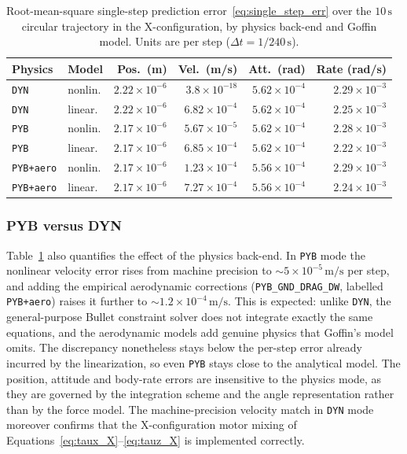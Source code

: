 \documentclass[11pt,a4paper]{article}
\theoremstyle{remark}
\numberwithin{equation}{section}
\begin{document}
\begin{table}[h]
    \centering
    \caption{Root-mean-square single-step prediction
    error~\eqref{eq:single_step_err} over the $10\,\mathrm{s}$ circular
    trajectory in the X-configuration, by physics back-end and Goffin model.
    Units are per step ($\Delta t = 1/240\,\mathrm{s}$).}
    \label{tab:singlestep_rms}
    \small
    \begin{tabular}{ll rrrr}
        \toprule
        Physics & Model & Pos.\ (m) & Vel.\ (m/s) & Att.\ (rad) & Rate (rad/s) \\
        \midrule
        \texttt{DYN} & nonlin. & $2.22\!\times\!10^{-6}$ & $3.8\!\times\!10^{-18}$ & $5.62\!\times\!10^{-4}$ & $2.29\!\times\!10^{-3}$ \\
        \texttt{DYN} & linear. & $2.22\!\times\!10^{-6}$ & $6.82\!\times\!10^{-4}$ & $5.62\!\times\!10^{-4}$ & $2.25\!\times\!10^{-3}$ \\
        \texttt{PYB} & nonlin. & $2.17\!\times\!10^{-6}$ & $5.67\!\times\!10^{-5}$ & $5.62\!\times\!10^{-4}$ & $2.28\!\times\!10^{-3}$ \\
        \texttt{PYB} & linear. & $2.17\!\times\!10^{-6}$ & $6.85\!\times\!10^{-4}$ & $5.62\!\times\!10^{-4}$ & $2.22\!\times\!10^{-3}$ \\
        \texttt{PYB+aero} & nonlin. & $2.17\!\times\!10^{-6}$ & $1.23\!\times\!10^{-4}$ & $5.56\!\times\!10^{-4}$ & $2.29\!\times\!10^{-3}$ \\
        \texttt{PYB+aero} & linear. & $2.17\!\times\!10^{-6}$ & $7.27\!\times\!10^{-4}$ & $5.56\!\times\!10^{-4}$ & $2.24\!\times\!10^{-3}$ \\
        \bottomrule
    \end{tabular}
\end{table}

\subsubsection*{PYB versus DYN}

Table~\ref{tab:singlestep_rms} also quantifies the effect of the physics
back-end. In \texttt{PYB} mode the nonlinear velocity error rises from machine
precision to $\sim 5\times10^{-5}\,\mathrm{m/s}$ per step, and adding the
empirical aerodynamic corrections (\texttt{PYB\_GND\_DRAG\_DW}, labelled
\texttt{PYB+aero}) raises it further to $\sim 1.2\times10^{-4}\,\mathrm{m/s}$.
This is expected: unlike \texttt{DYN}, the general-purpose Bullet constraint
solver does not integrate exactly the same equations, and the aerodynamic models
add genuine physics that Goffin's model omits. The discrepancy nonetheless
stays below the per-step error already incurred by the linearization, so even
\texttt{PYB} stays close to the analytical model. The position, attitude and
body-rate errors are insensitive to the physics mode, as they are governed by the
integration scheme and the angle representation rather than by the force model.
The machine-precision velocity match in \texttt{DYN} mode moreover confirms that
the X-configuration motor mixing of
Equations~\eqref{eq:taux_X}--\eqref{eq:tauz_X} is implemented correctly.
\end{document}
